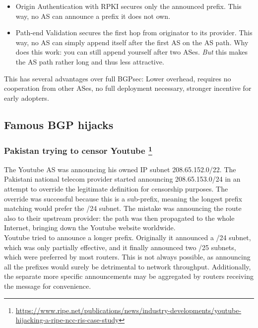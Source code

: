 \documentclass[11pt,oneside,a4paper]{article}
\begin{document}
\vspace{-\topsep}
\begin{itemize}
	\setlength{\itemsep}{0pt}
	\setlength{\parskip}{0pt}
	\item Origin Authentication with RPKI secures only the announced prefix. This way, no AS can announce a prefix it does not own.
	\item Path-end Validation secures the first hop	from originator to its provider. This way, no AS can simply append itself after the first AS on the AS path. Why does this work: you can still append yourself after two ASes. \textit{But} this makes the AS path rather long and thus less attractive.
\end{itemize}
\vspace{-\topsep}

This has several advantages over full BGPsec: Lower overhead, requires no cooperation from other ASes, no full deployment necessary, stronger incentive for early adopters.

\newpage

\subsection{Famous BGP hijacks}

\subsubsection[Pakistan trying to censor Youtube]{Pakistan trying to censor Youtube \footnote{\href{https://www.ripe.net/publications/news/industry-developments/youtube-hijacking-a-ripe-ncc-ris-case-study}{https://www.ripe.net/publications/news/industry-developments/youtube-hijacking-a-ripe-ncc-ris-case-study}}}

The Youtube AS was announcing his owned IP subnet 208.65.152.0/22. The Pakistani national telecom provider started announcing 208.65.153.0/24 in an attempt to override the legitimate definition for censorship purposes. The override was successful because this is a sub-prefix, meaning the longest prefix matching would prefer the /24 subnet. The mistake was announcing the route also to their upstream provider: the path was then propagated to the whole Internet, bringing down the Youtube website worldwide.\\
Youtube tried to announce a longer prefix. Originally it announced a /24 subnet, which was only partially effective, and it finally announced two /25 subnets, which were preferred by most routers. This is not always possible, as announcing all the prefixes would surely be detrimental to network throughput. Additionally, the separate more specific announcements may be aggregated by routers receiving the message for convenience.
\end{document}
